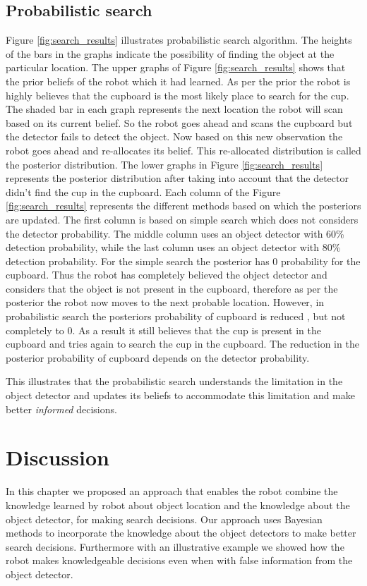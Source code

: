 \subsection{Probabilistic search}

Figure \ref{fig:search_results} illustrates probabilistic search algorithm. The heights of the bars in the graphs indicate the possibility of finding the object at the particular location. The upper graphs of Figure \ref{fig:search_results} shows that the prior beliefs of the robot which it had learned. As per the prior the robot is highly believes that the cupboard is the most likely place to search for the cup. The shaded bar in each graph represents the next location the robot will scan based on its current belief. So the robot goes ahead and scans the cupboard but the detector fails to detect the object. Now based on this new observation the robot goes ahead and re-allocates its belief. This re-allocated distribution is called the posterior distribution. The lower graphs in Figure \ref{fig:search_results} represents the posterior distribution after taking into account that the detector didn’t find the cup in the cupboard. Each column of the Figure \ref{fig:search_results} represents the different methods based on which the posteriors are updated. The first column is based on simple search which does not considers the detector probability. The middle column uses an object detector with 60\% detection probability, while the last column uses an object detector with 80\% detection probability. For the simple search the posterior has $0$ probability for the cupboard. Thus the robot has completely believed the object detector and considers that the object is not present in the cupboard, therefore as per the posterior the robot now moves to the next probable location. However, in probabilistic search the posteriors probability of cupboard is reduced , but not completely to $0$. As a result it still believes that the cup is present in the cupboard and tries again to search the cup in the cupboard. The reduction in the posterior probability of cupboard depends on the detector probability. 

This illustrates that the probabilistic search understands the limitation in the object detector and updates its beliefs to accommodate this limitation and make better \emph{informed} decisions.  


\section{Discussion}
In this chapter we proposed an approach that enables the robot combine the knowledge learned by robot about object location and the knowledge about the object detector, for making search decisions. Our approach uses Bayesian methods to incorporate the knowledge about the object detectors to make better search decisions. Furthermore with an illustrative example we showed how the robot makes knowledgeable decisions even when with false information from the object detector.
